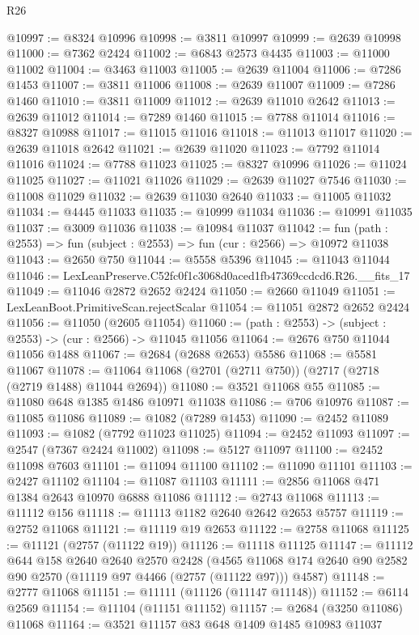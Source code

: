 \begin{lexlean}{R26}
\begin{coremodule}
@10997 := @8324 @10996
@10998 := @3811 @10997
@10999 := @2639 @10998
@11000 := @7362 @2424
@11002 := @6843 @2573 @4435
@11003 := @11000 @11002
@11004 := @3463 @11003
@11005 := @2639 @11004
@11006 := @7286 @1453
@11007 := @3811 @11006
@11008 := @2639 @11007
@11009 := @7286 @1460
@11010 := @3811 @11009
@11012 := @2639 @11010 @2642
@11013 := @2639 @11012
@11014 := @7289 @1460
@11015 := @7788 @11014
@11016 := @8327 @10988
@11017 := @11015 @11016
@11018 := @11013 @11017
@11020 := @2639 @11018 @2642
@11021 := @2639 @11020
@11023 := @7792 @11014 @11016
@11024 := @7788 @11023
@11025 := @8327 @10996
@11026 := @11024 @11025
@11027 := @11021 @11026
@11029 := @2639 @11027 @7546
@11030 := @11008 @11029
@11032 := @2639 @11030 @2640
@11033 := @11005 @11032
@11034 := @4445 @11033
@11035 := @10999 @11034
@11036 := @10991 @11035
@11037 := @3009 @11036
@11038 := @10984 @11037
@11042 := fun (path : @2553) => fun (subject : @2553) => fun (cur : @2566) => @10972 @11038
@11043 := @2650 @750
@11044 := @5558 @5396
@11045 := @11043 @11044
@11046 := LexLeanPreserve.C52fc0f1c3068d0aced1fb47369ccdcd6.R26.__fits_17
@11049 := @11046 @2872 @2652 @2424
@11050 := @2660 @11049
@11051 := LexLeanBoot.PrimitiveScan.rejectScalar
@11054 := @11051 @2872 @2652 @2424
@11056 := @11050 (@2605 @11054)
@11060 := (path : @2553) -> (subject : @2553) -> (cur : @2566) -> @11045 @11056
@11064 := @2676 @750 @11044 @11056 @1488
@11067 := @2684 (@2688 @2653) @5586
@11068 := @5581 @11067
@11078 := @11064 @11068 (@2701 (@2711 @750)) (@2717 (@2718 (@2719 @1488) @11044 @2694))
@11080 := @3521 @11068 @55
@11085 := @11080 @648 @1385 @1486 @10971 @11038
@11086 := @706 @10976
@11087 := @11085 @11086
@11089 := @1082 (@7289 @1453)
@11090 := @2452 @11089
@11093 := @1082 (@7792 @11023 @11025)
@11094 := @2452 @11093
@11097 := @2547 (@7367 @2424 @11002)
@11098 := @5127 @11097
@11100 := @2452 @11098 @7603
@11101 := @11094 @11100
@11102 := @11090 @11101
@11103 := @2427 @11102
@11104 := @11087 @11103
@11111 := @2856 @11068 @471 @1384 @2643 @10970 @6888 @11086
@11112 := @2743 @11068
@11113 := @11112 @156
@11118 := @11113 @1182 @2640 @2642 @2653 @5757
@11119 := @2752 @11068
@11121 := @11119 @19 @2653
@11122 := @2758 @11068
@11125 := @11121 (@2757 (@11122 @19))
@11126 := @11118 @11125
@11147 := @11112
    @644
    @158
    @2640
    @2640
    @2570
    @2428
    (@4565 @11068 @174 @2640 @90 @2582 @90 @2570 (@11119 @97 @4466 (@2757 (@11122 @97))) @4587)
@11148 := @2777 @11068
@11151 := @11111 (@11126 (@11147 @11148))
@11152 := @6114 @2569
@11154 := @11104 (@11151 @11152)
@11157 := @2684 (@3250 @11086) @11068
@11164 := @3521 @11157 @83 @648 @1409 @1485 @10983 @11037

\end{coremodule}
\end{lexlean}
